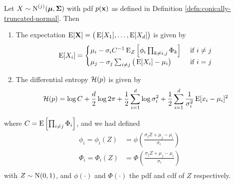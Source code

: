 \begin{lemma}\label{lem:expectation-entropy-truncated-mvn}
  Let $X \sim \N^{(j)}(\bmu, \bSigma)$ with pdf $p(\bx)$ as defined in Definition \ref{defn:conically-truncated-normal}. Then
  \begin{enumerate}[label=(\roman*)]
    \item The expectation $\E[\bX] = \big(\E[X_1], \dots, \E[X_d] \big)$ is given by
    \[
      \E[X_i] =
      \begin{cases}
        \mu_i - \sigma_i C^{-1} \E_Z\left[\phi_i \prod_{k \neq i,j} \Phi_k \right] 
        &\text{ if } i \neq j \\
        \mu_j - \sigma_j \sum_{i \neq j} \big(\E[X_i] - \mu_i \big) &\text{ if } i = j \\
      \end{cases}
    \]
    \item The differential entropy $\cH(p)$ is given by
    \[
    \cH(p) = \log C + \half[d] \log 2\pi + \half \sum_{i=1}^d \log \sigma_i^2 + \half \sum_{i=1}^d \frac{1}{\sigma_i^2} \E [ x_i - \mu_i ]^2
    \]
  \end{enumerate} 
  where $C = \E \left[ \prod_{i \neq j} \Phi_i \right]$, and we had defined
  \begin{align*}
    \phi_i = \phi_i(Z) &= \phi \left( \frac{\sigma_j Z + \mu_j - \mu_i}{\sigma_i} \right) \\
    \Phi_i = \Phi_i(Z) &= \Phi \left( \frac{\sigma_j Z + \mu_j - \mu_i}{\sigma_i} \right) \\    
  \end{align*}
  with $Z \sim \N(0,1)$, and $\phi(\cdot)$ and $\Phi(\cdot)$ the pdf and cdf of $Z$ respectively.
\end{lemma}

